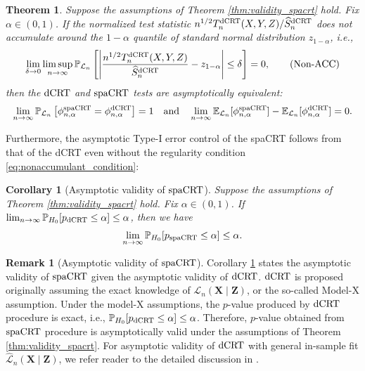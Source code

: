 \documentclass[12pt]{article}
\newtheorem{theorem}{Theorem}
\newtheorem{corollary}{Corollary}
\theoremstyle{definition}
\newtheorem{remark}{Remark}
\def\P{\mathbb{P}}
\def\P{\mathbb{P}}
\newcommand{\E}{\mathbb E}								%
\renewcommand{\P}{\mathbb{P}}							%
\newcommand{\prx}{\bm X}								%
\newcommand{\srx}{X}									%
\newcommand{\prz}{\bm Z}								%
\newcommand{\srz}{Z}									%
\newcommand{\sry}{Y}									%
\newcommand{\law}{\mathcal L}							%
\newcommand{\lawhat}{\widehat{\mathcal L}}				%
\newcommand{\dCRT}{\textnormal{dCRT}} 					%
\newcommand{\spacrt}{\textnormal{spaCRT}}               %
\begin{document}
\begin{theorem}\label{thm:asymptotic_equivalence}
	Suppose the assumptions of Theorem \ref{thm:validity_spacrt} hold. Fix $\alpha\in (0,1)$. If the normalized test statistic $n^{1/2}T_n^{\dCRT}(\srx,\sry,\srz)/\widehat{S}_n^{\dCRT}$ does not accumulate around the $1-\alpha$ quantile of standard normal distribution $z_{1-\alpha}$, i.e.,
  \begin{align}\label{eq:nonaccumulant_condition}
    \lim_{\delta\rightarrow0}\limsup_{n\rightarrow\infty}\P_{\law_n}\left[\left|\frac{n^{1/2}T_n^{\dCRT}(\srx,\sry,\srz)}{\widehat{S}_n^{\dCRT}}-z_{1-\alpha}\right|\leq \delta\right]=0,\tag{Non-ACC}
  \end{align}
  then the $\dCRT$ and $\spacrt$ tests are asymptotically equivalent:
  \begin{align*}
    \lim_{n\rightarrow\infty}\P_{\law_n}\left[\phi_{n,\alpha}^{\spacrt}=\phi_{n,\alpha}^{\dCRT}\right]=1 \quad \text{and} \quad \lim_{n\rightarrow\infty}\E_{\law_n}[\phi_{n,\alpha}^{\spacrt}]-\E_{\law_n}[\phi_{n,\alpha}^{\dCRT}]=0.
  \end{align*}
\end{theorem}
\noindent Furthermore, the asymptotic Type-I error control of the spaCRT follows from that of the dCRT even without the regularity condition \eqref{eq:nonaccumulant_condition}:

\begin{corollary}[Asymptotic validity of $\spacrt$]\label{cor:asymptotic_validity_spacrt}
  Suppose the assumptions of Theorem \ref{thm:validity_spacrt} hold. Fix $\alpha\in (0,1)$. If $\lim_{n\rightarrow\infty}\P_{H_0}[p_{\dCRT}\leq \alpha]\leq \alpha$, then we have 
  \begin{align*}
    \lim_{n\rightarrow\infty}\P_{H_0}[p_{\spacrt}\leq \alpha]\leq \alpha.
  \end{align*}
\end{corollary}

\begin{remark}[Asymptotic validity of $\spacrt$]
	Corollary \ref{cor:asymptotic_validity_spacrt} states the asymptotic validity of $\spacrt$ given the asymptotic validity of $\dCRT$. $\dCRT$ is proposed originally assuming the exact knowledge of $\law_n(\prx\mid\prz)$, or the so-called Model-X assumption. Under the model-X assumptions, the $p$-value produced by $\dCRT$ procedure is exact, i.e., $\P_{H_0}[p_{\dCRT}\leq \alpha]\leq \alpha$. Therefore, $p$-value obtained from $\spacrt$ procedure is asymptotically valid under the assumptions of Theorem \ref{thm:validity_spacrt}. For asymptotic validity of $\dCRT$ with general in-sample fit $\lawhat_n(\prx\mid\prz)$, we refer reader to the detailed discussion in \cite{Niu2022a}.
\end{remark}
\end{document}
